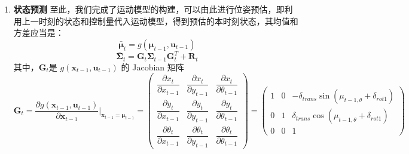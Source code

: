 \documentclass[../main.tex]{subfiles}
\begin{document}
\begin{enumerate}
{{\begin{enumerate}
    其中
    $$
    \mathbf{V}_t = \frac{\partial g(\mathbf{x}_{t-1},\mathbf{u}_{t-1})}{\partial \mathbf{u}_{t-1}}
    =
    \begin{pmatrix}
      \dfrac{\partial x_t}{\partial \delta_{rot1}} & \dfrac{\partial x_t}{\partial \delta_{trans}} & \dfrac{\partial x_t}{\partial \delta_{rot2}}\\[6pt]
      \dfrac{\partial y_t}{\partial \delta_{rot1}} & \dfrac{\partial y_t}{\partial \delta_{trans}} & \dfrac{\partial y_t}{\partial \delta_{rot2}}\\[6pt]
      \dfrac{\partial \theta_t}{\partial \delta_{rot1}} & \dfrac{\partial \theta_t}{\partial \delta_{trans}} & \dfrac{\partial \theta_t}{\partial \delta_{rot2}}
    \end{pmatrix}
    $$
    
    在具体代入时：
    $$
    \mathbf{V}_t =
    \begin{pmatrix}
      -\delta_{trans}\sin(\mu_{t-1,\theta} + \delta_{rot1}) & \cos(\mu_{t-1,\theta} + \delta_{rot1}) & 0\\[6pt]
      \delta_{trans}\cos(\mu_{t-1,\theta} + \delta_{rot1}) & \sin(\mu_{t-1,\theta} + \delta_{rot1}) & 0\\[6pt]
      1 & 0 & 1
    \end{pmatrix}
    $$
    \item \textbf{状态预测}
    至此，我们完成了运动模型的构建，可以由此进行位姿预估，即利用上一时刻的状态和控制量代入运动模型，得到预估的本时刻状态，其均值和方差应当是：
    $$
    \bar{\boldsymbol{\mu}}_t = g(\boldsymbol{\mu}_{t-1},\mathbf{u}_{t-1})
    $$
    $$
    \bar{\boldsymbol{\Sigma}}_t = \mathbf{G}_t \boldsymbol{\Sigma}_{t-1} \mathbf{G}_t^T + \mathbf{R}_t
    $$
    其中，$\mathbf{G}_t$是 $g(\mathbf{x}_{t-1},\mathbf{u}_{t-1})$ 的 Jacobian 矩阵
    $$
    \mathbf{G}_t = \frac{\partial g(\mathbf{x}_{t-1},\mathbf{u}_{t-1})}{\partial \mathbf{x}_{t-1}}\bigg|_{\mathbf{x}_{t-1}=\boldsymbol{\mu}_{t-1}}
    =
    \begin{pmatrix}
      \dfrac{\partial x_t}{\partial x_{t-1}} & \dfrac{\partial x_t}{\partial y_{t-1}} & \dfrac{\partial x_t}{\partial \theta_{t-1}}\\[6pt]
      \dfrac{\partial y_t}{\partial x_{t-1}} & \dfrac{\partial y_t}{\partial y_{t-1}} & \dfrac{\partial y_t}{\partial \theta_{t-1}}\\[6pt]
      \dfrac{\partial \theta_t}{\partial x_{t-1}} & \dfrac{\partial \theta_t}{\partial y_{t-1}} & \dfrac{\partial \theta_t}{\partial \theta_{t-1}}
    \end{pmatrix}
    =
    \begin{pmatrix}
      1 & 0 & -\delta_{trans}\sin(\mu_{t-1,\theta} + \delta_{rot1})\\[6pt]
      0 & 1 & \delta_{trans}\cos(\mu_{t-1,\theta} + \delta_{rot1})\\[6pt]
      0 & 0 & 1
    \end{pmatrix}
    $$


\end{enumerate}}}
\end{enumerate}
\end{document}
